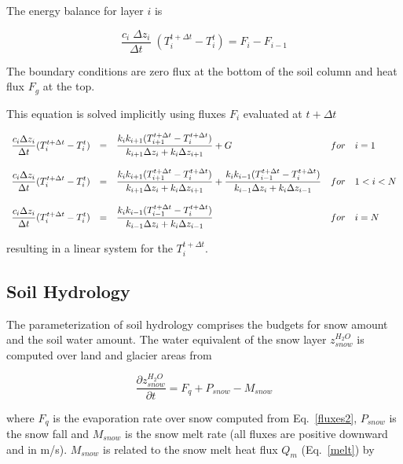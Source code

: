 The energy balance for layer $i$ is 

\begin{equation}
\frac{c_i\;  \Delta z_i}{\Delta t} \; (T_i^{t+\Delta t} -
T_i ^{t})  = F_i - F_{i-1}
\end{equation}


The boundary conditions are zero flux at the bottom
of the soil column and heat flux $F_g$  at the top.

This equation is solved implicitly using fluxes
$F_i$ evaluated at $t+\Delta t$

\begin{equation}
\begin{array}{lclcl}
\displaystyle \frac{c_i \Delta z_i}{\Delta t} (T_i^{t+\Delta t} -
T_i ^{t})  & = &\displaystyle  \frac{k_i k_{i+1}
(T_{i+1}^{t+\Delta
t} - T_i^{t+\Delta t})}{k_{i+1} \Delta z_i + k_i
\Delta z_{i+1}} +  G & for  & \displaystyle  i = 1 \\
& & & &  \\
\displaystyle \frac{c_i \Delta z_i}{\Delta t} (T_i^{t+\Delta t} -
T_i ^{t}) &  = &\displaystyle  \frac{k_i k_{i+1}
(T_{i+1}^{t+\Delta
t} - T_i^{t+\Delta t})}{k_{i+1} \Delta z_i + k_i
\Delta z_{i+1}} +  \frac{k_i k_{i-1} (T_{i-
1}^{t+\Delta t} - T_i^{t+\Delta t})}{k_{i-1} \Delta
z_i + k_i \Delta z_{i-1}} & for & \displaystyle 1 < i < N \\
& & & & \\
\displaystyle \frac{c_i \Delta z_i}{\Delta t} (T_i^{t+\Delta t} -
T_i ^{t}) &  = &\displaystyle  \frac{k_i k_{i-1} (T_{i-
1}^{t+\Delta t} - T_i^{t+\Delta t})}{k_{i-1} \Delta
z_i + k_i \Delta z_{i-1}} & for & \displaystyle i = N 
\end{array}
\end{equation}

resulting in a linear system for the $T_i^{t+\Delta
t}$.
                          
\subsection{Soil Hydrology}\label{hydro}

The parameterization of soil hydrology comprises the
budgets for snow amount and the soil
water amount. The water equivalent of the snow layer
$z_{snow}^{H_2O}$ is computed over
land and glacier areas from

\begin{equation}
\frac{\partial z_{snow}^{H_2O}}{\partial t} = F_q +
P_{snow}-M_{snow}
\end{equation}

where $F_q$ is the evaporation rate over snow
computed from Eq.~\ref{fluxes2}, $P_{snow}$ is the
snow fall and $M_{snow}$ is the snow
melt rate (all fluxes are positive downward and in m/s).
$M_{snow}$ is related to the snow melt
heat flux $Q_m$ (Eq.~\ref{melt}) by

